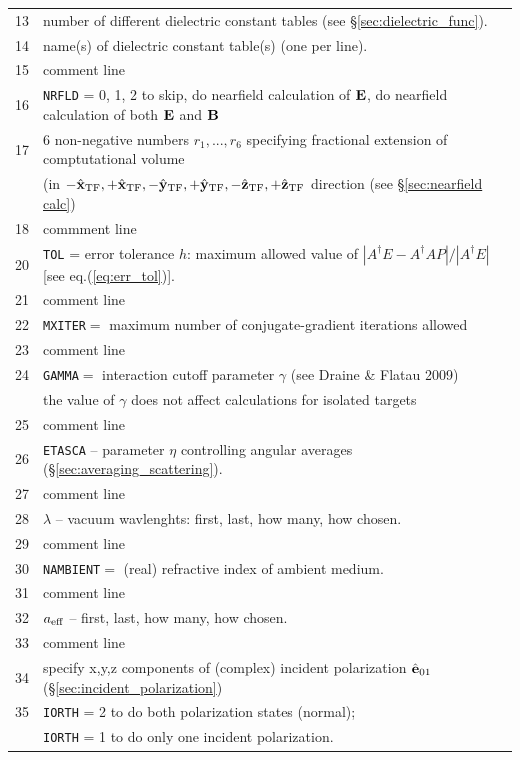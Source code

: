 \begin{appendix}
{\begin{tabular}{l l}
13	&number of different dielectric constant tables (see \S\ref{sec:dielectric_func}).\\
14	&name(s) of dielectric constant table(s) (one per line).\\
15	&comment line\\
16      &{\tt NRFLD} = 0, 1, 2 to skip, do nearfield calculation of ${\bf E}$, do
        nearfield calculation of both ${\bf E}$ and ${\bf B}$\\
17      &6 non-negative numbers $r_1,...,r_6$ specifying fractional extension of
         comptutational volume\\
        & (in $-\hat{\bf x}_{\rm TF},+\hat{\bf x}_{\rm TF},-\hat{\bf y}_{\rm TF},+\hat{\bf y}_{\rm TF},-\hat{\bf z}_{\rm TF},+\hat{\bf z}_{\rm TF}$
         direction (see \S\ref{sec:nearfield calc})\\
18      &commment line\\
20	&{\tt TOL} = error tolerance $h$: maximum allowed value of 
	$|A^\dagger E-A^\dagger AP|/|A^\dagger E|$ [see eq.(\ref{eq:err_tol})].\\
21	&comment line\\
22      &{\tt MXITER}$=$ maximum number of conjugate-gradient iterations 
         allowed\\
23      &comment line\\
24	&{\tt GAMMA}$=$ interaction cutoff parameter $\gamma$ 
         (see Draine \& Flatau 2009)\\
        &the value of $\gamma$ does not affect calculations for 
         isolated targets\\
25      &comment line\\
26	&{\tt ETASCA} -- parameter $\eta$ controlling angular averages (\S\ref{sec:averaging_scattering}).\\
27	&comment line\\
28	&$\lambda$ -- vacuum wavlenghts: first, last, how many, how chosen.\\
29	&comment line\\
30      &{\tt NAMBIENT}$=$ (real) refractive index of ambient medium.\\
31      & comment line\\
32	&$a_{\rm eff}$ -- first, last, how many, how chosen.\\
33	&comment line\\
34	&specify x,y,z components of (complex) incident polarization ${\hat{\bf e}}_{01}$ (\S\ref{sec:incident_polarization})\\
35	&{\tt IORTH} = 2 to do both polarization states (normal);\\
	&{\tt IORTH} = 1 to do only one incident polarization.\\

\end{tabular}}
\end{appendix}
